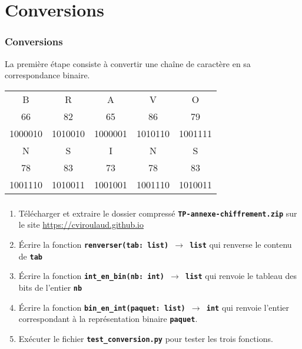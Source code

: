 \documentclass[svgnames,11pt]{beamer}
\begin{document}
\section{Conversions}
\begin{frame}
    \frametitle{Conversions}

    La première étape consiste à convertir une chaîne de caractère en sa correspondance binaire.
    \begin{center}
        \begin{tabular}{*{5}{c}}
            B       & R       & A       & V       & O       \\

            66      & 82      & 65      & 86      & 79      \\
            1000010 & 1010010 & 1000001 & 1010110 & 1001111 \\
            N       & S       & I       & N       & S       \\

            78      & 83      & 73      & 78      & 83      \\
            1001110 & 1010011 & 1001001 & 1001110 & 1010011 \\
        \end{tabular}
    \end{center}
\end{frame}
\begin{frame}
    \frametitle{}

    \begin{activite}
        \begin{enumerate}
            \item Télécharger et extraire le dossier compressé \textbf{\texttt{TP-annexe-chiffrement.zip}} sur le site \url{https://cviroulaud.github.io}
            \item Écrire la fonction \textbf{\texttt{renverser(tab: list) $\rightarrow$ list}} qui renverse le contenu de \textbf{\texttt{tab}}
            \item Écrire la fonction \textbf{\texttt{int\_en\_bin(nb: int) $\rightarrow$ list}} qui renvoie le tableau des bits de l'entier \textbf{\texttt{nb}}
            \item Écrire la fonction \textbf{\texttt{bin\_en\_int(paquet: list) $\rightarrow$ int}} qui renvoie l'entier correspondant à la représentation binaire \textbf{\texttt{paquet}}.
            \item Exécuter le fichier \textbf{\texttt{test\_conversion.py}} pour tester les trois fonctions.
        \end{enumerate}
    \end{activite}

\end{frame}
\end{document}
